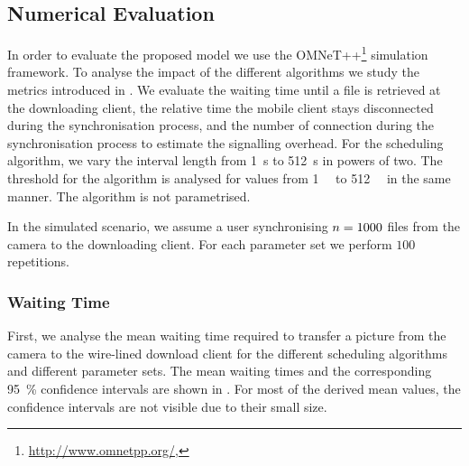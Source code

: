 \subsection{Numerical Evaluation}\label{sec:application:cloud_file_synchronisation:numerical_evaluation}
In order to evaluate the proposed model we use the OMNeT++\footnote{\url{http://www.omnetpp.org/}, \accessed} simulation framework.
To analyse the impact of the different algorithms we study the metrics introduced in .
We evaluate the waiting time \sojournTime until a file is retrieved at the downloading client, the relative time the mobile client stays disconnected \relativeDisconnectedTime during the synchronisation process, and the number of connection \connectionCount during the synchronisation process to estimate the signalling overhead.
For the \algointerval scheduling algorithm, we vary the interval length from \SI{1}{\second} to \SI{512}{\second} in powers of two.
The threshold for the \algosize algorithm is analysed for values from \SI{1}{\mega\byte} to \SI{512}{\mega\byte} in the same manner.
The \algoimmediate algorithm is not parametrised.

In the simulated scenario, we assume a user synchronising \(n = 1000\) files from the camera to the downloading client.
For each parameter set we perform \(100\) repetitions.

\subsubsection*{Waiting Time}\label{sec:application:cloud_file_synchronisation:numerical_evaluation:waiting_time}
First, we analyse the mean waiting time \sojournTime required to transfer a picture from the camera to the wire-lined download client for the different scheduling algorithms and different parameter sets.
The mean waiting times \sojournTime and the corresponding \SI{95}{\percent} confidence intervals are shown in .
For most of the derived mean values, the confidence intervals are not visible due to their small size.

